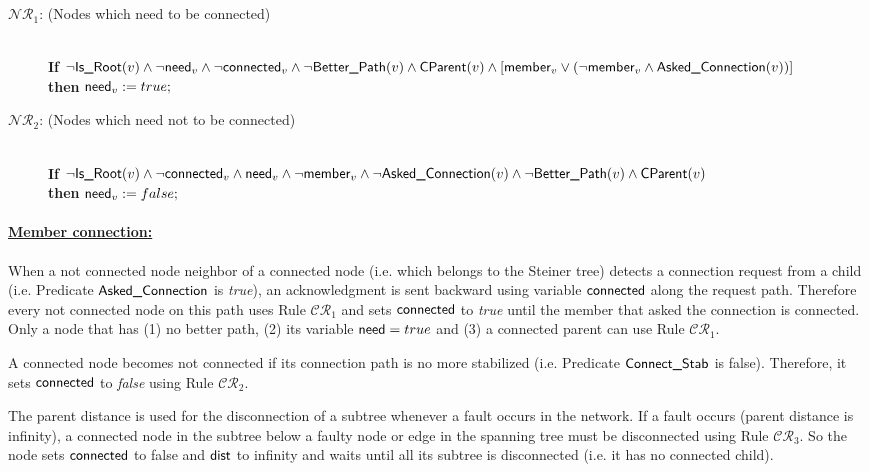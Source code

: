 \documentclass[11pt]{article}
\newcommand{\dist}{\mbox{\sf dist}}
\newcommand{\need}{\mbox{\sf need}}
\newcommand{\connect}{\mbox{\sf connected}}
\newcommand{\member}{\mbox{\sf member}}
\newcommand{\IsRoot}{\mbox{\sf Is\_Root}}
\newcommand{\CParent}{\mbox{\sf CParent}}
\newcommand{\Better}{\mbox{\sf Better\_Path}}
\newcommand{\Ask}{\mbox{\sf Asked\_Connection}}
\newcommand{\ConnectS}{\mbox{\sf Connect\_Stab}}
\newcommand{\CRB}{$\mathcal{NR}_1$}
\newcommand{\CRC}{$\mathcal{NR}_2$}
\newcommand{\CRD}{$\mathcal{CR}_1$}
\newcommand{\CRE}{$\mathcal{CR}_2$}
\newcommand{\CRG}{$\mathcal{CR}_3$}
\begin{document}
\begin{small}
\begin{description}
\item[\CRB: (Nodes which need to be connected)]~\\\textbf{If} $\neg \IsRoot(v) \wedge \neg \need_v \wedge \neg \connect_v \wedge \neg \Better(v) \wedge \CParent(v) \wedge [\member_v \vee (\neg \member_v \wedge \Ask(v))]$\\
\textbf{then} $\need_v:=true;$
\item[\CRC: (Nodes which need not to be connected)]~\\\textbf{If} $\neg \IsRoot(v) \wedge \neg \connect_v \wedge \need_v \wedge \neg \member_v \wedge \neg \Ask(v) \wedge \neg \Better(v) \wedge \CParent(v)$ \\
\textbf{then} $\need_v:=false;$
\end{description}
\end{small}
\paragraph{\underline{Member connection:}}

When a not connected node neighbor of a connected node (i.e. which
belongs to the Steiner tree) detects a connection request from a child
(i.e. Predicate $\Ask$ is \emph{true}), an acknowledgment is sent
backward using variable $\connect$ along the request path. Therefore
every not connected node 
on this path uses Rule \CRD\/ and sets $\connect$ to \emph{true} until
the member that asked the connection is connected. Only a node that
has (1) no better path, 
(2) its variable $\need=true$ and (3) a connected parent can use Rule
\CRD.

A connected node becomes not connected if its connection path is no
more stabilized (i.e. Predicate $\ConnectS$ is false). Therefore, it
sets $\connect$ to \emph{false} using Rule \CRE.

The parent distance is used for the disconnection of a subtree whenever a
fault occurs in the network. 
If a fault occurs (parent distance is infinity), a connected node in the subtree below a faulty node or edge in the spanning tree must be disconnected using Rule \CRG. So the node sets $\connect$ to false and $\dist$ to infinity and waits until all its subtree is disconnected (i.e. it has no connected child).
\end{document}
